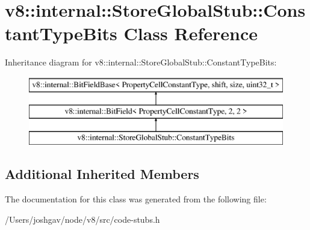 \hypertarget{classv8_1_1internal_1_1_store_global_stub_1_1_constant_type_bits}{}\section{v8\+:\+:internal\+:\+:Store\+Global\+Stub\+:\+:Constant\+Type\+Bits Class Reference}
\label{classv8_1_1internal_1_1_store_global_stub_1_1_constant_type_bits}
Inheritance diagram for v8\+:\+:internal\+:\+:Store\+Global\+Stub\+:\+:Constant\+Type\+Bits\+:\begin{figure}[H]
\begin{center}
\leavevmode
\includegraphics[height=3.000000cm]{classv8_1_1internal_1_1_store_global_stub_1_1_constant_type_bits}
\end{center}
\end{figure}
\subsection*{Additional Inherited Members}


The documentation for this class was generated from the following file\+:\begin{DoxyCompactItemize}
\item 
/\+Users/joshgav/node/v8/src/code-\/stubs.\+h\end{DoxyCompactItemize}
